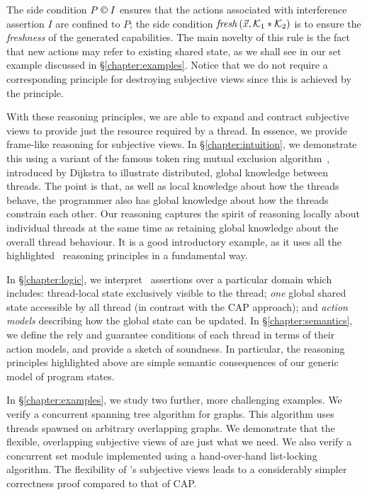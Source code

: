 The side condition $P \containI I$ ensures that the actions associated with interference assertion $I$ are confined to $P$; the side condition $\mathit{fresh}\left(\vec{x}, \mathcal{K}_{1} * \mathcal{K}_{2}\right)$ is to ensure the \emph{freshness} of the generated capabilities. 
The main novelty of this rule is the fact that new actions may refer to existing shared state, as we shall see  in our set example discussed in \S\ref{chapter:examples}. Notice that we do not require a corresponding principle for destroying subjective views since this is achieved by the \forgetRule principle. 

With these reasoning principles, we are able to expand and contract subjective views  to provide just the resource required by a thread.
In essence, we provide  frame-like reasoning for  subjective  views. 
In \S\ref{chapter:intuition}, we demonstrate this using a variant of the famous  token ring mutual exclusion algorithm~\cite{dijkstra74}, introduced by Dijkstra to illustrate distributed, global knowledge between threads. The point is that, as well as local knowledge about how the threads behave, the programmer also has global knowledge about how the threads constrain each other. Our reasoning captures the spirit of reasoning locally about individual threads at the same time as retaining global knowledge about the overall thread behaviour. It is a good  introductory example, as it uses all the highlighted \colosl\ reasoning principles in a fundamental way. 

In \S\ref{chapter:logic}, we interpret \colosl\ assertions over a particular domain which includes: thread-local state exclusively visible to the thread; {\em one} global shared state accessible by all thread (in contrast with the CAP approach); and {\em action models} describing how the global state can be updated. In \S\ref{chapter:semantics}, we define the rely and guarantee conditions of each thread in terms of their action models, and provide a sketch of soundness. In particular, the reasoning principles highlighted above are simple semantic
consequences of our generic model of program states.  


In \S\ref{chapter:examples}, we study two further, more challenging examples. We verify a concurrent spanning tree algorithm for graphs. This algorithm uses threads spawned on arbitrary overlapping graphs. We demonstrate that the flexible, overlapping subjective views of \colosl are just what we need.  We also verify a concurrent set
module implemented using a hand-over-hand list-locking algorithm.
The flexibility of \colosl's subjective views leads to a considerably simpler correctness proof compared to that of CAP. 


